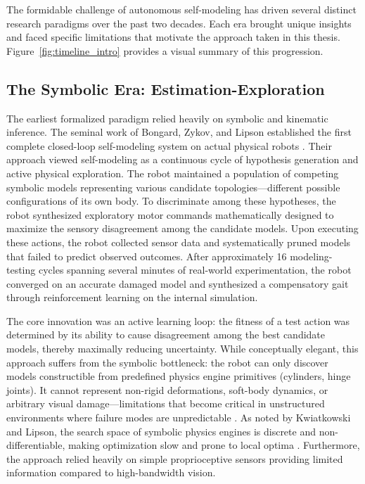 ﻿\documentclass[12pt,a4paper,oneside]{report}
\begin{document}
The formidable challenge of autonomous self-modeling has driven several distinct research paradigms over the past two decades. Each era brought unique insights and faced specific limitations that motivate the approach taken in this thesis. Figure~\ref{fig:timeline_intro} provides a visual summary of this progression.

\subsection{The Symbolic Era: Estimation-Exploration}

The earliest formalized paradigm relied heavily on symbolic and kinematic inference. The seminal work of Bongard, Zykov, and Lipson established the first complete closed-loop self-modeling system on actual physical robots \cite{bongard2006resilient}. Their approach viewed self-modeling as a continuous cycle of hypothesis generation and active physical exploration. The robot maintained a population of competing symbolic models representing various candidate topologies---different possible configurations of its own body. To discriminate among these hypotheses, the robot synthesized exploratory motor commands mathematically designed to maximize the sensory disagreement among the candidate models. Upon executing these actions, the robot collected sensor data and systematically pruned models that failed to predict observed outcomes. After approximately 16 modeling-testing cycles spanning several minutes of real-world experimentation, the robot converged on an accurate damaged model and synthesized a compensatory gait through reinforcement learning on the internal simulation.

The core innovation was an active learning loop: the fitness of a test action was determined by its ability to cause disagreement among the best candidate models, thereby maximally reducing uncertainty. While conceptually elegant, this approach suffers from the symbolic bottleneck: the robot can only discover models constructible from predefined physics engine primitives (cylinders, hinge joints). It cannot represent non-rigid deformations, soft-body dynamics, or arbitrary visual damage---limitations that become critical in unstructured environments where failure modes are unpredictable \cite{kwiatkowski2019task}. As noted by Kwiatkowski and Lipson, the search space of symbolic physics engines is discrete and non-differentiable, making optimization slow and prone to local optima \cite{kwiatkowski2019task}. Furthermore, the approach relied heavily on simple proprioceptive sensors providing limited information compared to high-bandwidth vision.
\end{document}

